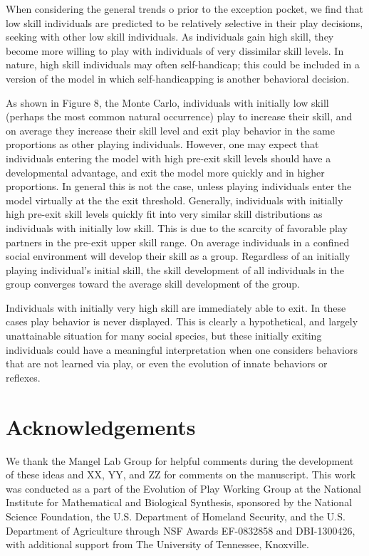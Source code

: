 \documentclass[12pt, letterpaper, fleqn]{article}
\begin{document}
%
%

%
When considering the general trends o prior to the exception pocket, we find that low skill individuals are predicted to be relatively selective in their play decisions, seeking with other low skill individuals. 
%
As individuals gain high skill, they become more willing to play with individuals of very dissimilar skill levels. In nature, high skill individuals may often self-handicap; this could be included in a version of the model in which self-handicapping is another behavioral decision.

%
%

%
As shown in Figure 8, the Monte Carlo, individuals with initially low skill (perhaps the most common natural occurrence) play to increase their skill, and on average they increase their skill level and exit play behavior in the same proportions as other playing individuals. 
%
However, one may expect that individuals entering the model with high pre-exit skill levels should have a developmental advantage, and exit the model more quickly and in higher proportions.
%
In general this is not the case, unless playing individuals enter the model virtually at the the exit threshold. 
%
Generally, individuals with initially high pre-exit skill levels quickly fit into very similar skill distributions as individuals with initially low skill. 
This is due to the scarcity of favorable play partners in the pre-exit upper skill range. 
%
On average individuals in a confined social environment will develop their skill as a group. 
%
Regardless of an initially playing individual’s initial skill, the skill development of all individuals in the group converges toward the average skill development of the group.

%
%

%
Individuals with initially very high skill are immediately able to exit.
%
In these cases play behavior is never displayed. 
%
This is clearly a hypothetical, and largely unattainable situation for many social species, but these initially exiting individuals could have a meaningful interpretation when one considers behaviors that are not learned via play, or even the evolution of innate behaviors or reflexes.

%
%
\section*{Acknowledgements}
%
%

%
We thank the Mangel Lab Group for helpful comments during the development of these ideas and {\color{red}XX, YY, and ZZ} for comments on the manuscript. 
%
This work was conducted as a part of the Evolution of Play Working Group at the National Institute for Mathematical and Biological Synthesis, sponsored by the National Science Foundation, the U.S. Department of Homeland Security, and the U.S. Department of Agriculture through NSF Awards EF-0832858 and DBI-1300426, with additional support from The University of Tennessee, Knoxville.
\end{document}
